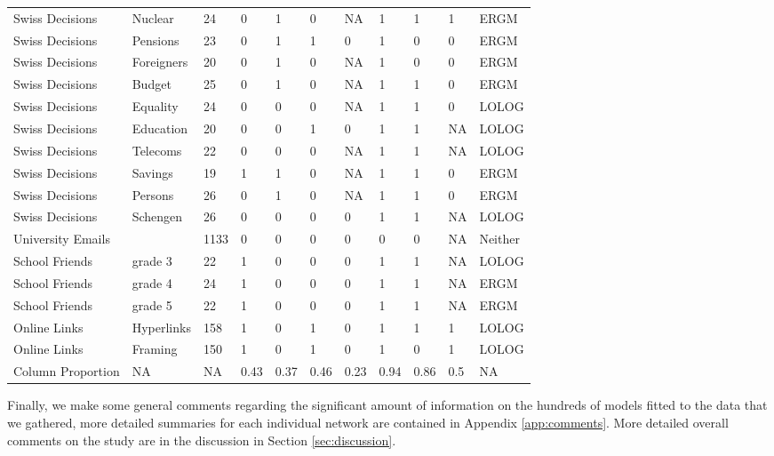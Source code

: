 \documentclass[
]{statsoc}
\begin{document}
\begin{table}
\begin{tabular}[t]{lllllllllll}
\addlinespace
\rowcolor{gray!6}  Swiss Decisions & Nuclear & 24 & 0 & 1 & 0 & NA & 1 & 1 & 1 & ERGM\\
Swiss Decisions & Pensions & 23 & 0 & 1 & 1 & 0 & 1 & 0 & 0 & ERGM\\
\rowcolor{gray!6}  Swiss Decisions & Foreigners & 20 & 0 & 1 & 0 & NA & 1 & 0 & 0 & ERGM\\
Swiss Decisions & Budget & 25 & 0 & 1 & 0 & NA & 1 & 1 & 0 & ERGM\\
\rowcolor{gray!6}  Swiss Decisions & Equality & 24 & 0 & 0 & 0 & NA & 1 & 1 & 0 & LOLOG\\
\addlinespace
Swiss Decisions & Education & 20 & 0 & 0 & 1 & 0 & 1 & 1 & NA & LOLOG\\
\rowcolor{gray!6}  Swiss Decisions & Telecoms & 22 & 0 & 0 & 0 & NA & 1 & 1 & NA & LOLOG\\
Swiss Decisions & Savings & 19 & 1 & 1 & 0 & NA & 1 & 1 & 0 & ERGM\\
\rowcolor{gray!6}  Swiss Decisions & Persons & 26 & 0 & 1 & 0 & NA & 1 & 1 & 0 & ERGM\\
Swiss Decisions & Schengen & 26 & 0 & 0 & 0 & 0 & 1 & 1 & NA & LOLOG\\
\addlinespace
\rowcolor{gray!6}  University Emails &  & 1133 & 0 & 0 & 0 & 0 & 0 & 0 & NA & Neither\\
School Friends & grade 3 & 22 & 1 & 0 & 0 & 0 & 1 & 1 & NA & LOLOG\\
\rowcolor{gray!6}  School Friends & grade 4 & 24 & 1 & 0 & 0 & 0 & 1 & 1 & NA & ERGM\\
School Friends & grade 5 & 22 & 1 & 0 & 0 & 0 & 1 & 1 & NA & ERGM\\
\rowcolor{gray!6}  Online Links & Hyperlinks & 158 & 1 & 0 & 1 & 0 & 1 & 1 & 1 & LOLOG\\
\addlinespace
Online Links & Framing & 150 & 1 & 0 & 1 & 0 & 1 & 0 & 1 & LOLOG\\
\hline
\hline
\rowcolor{gray!6}  Column Proportion & NA & NA & 0.43 & 0.37 & 0.46 & 0.23 & 0.94 & 0.86 & 0.5 & NA\\
\bottomrule
\end{tabular}
\end{table}

Finally, we make some general comments regarding the significant amount
of information on the hundreds of models fitted to the data that we
gathered, more detailed summaries for each individual network are
contained in Appendix \ref{app:comments}. More detailed overall comments
on the study are in the discussion in Section \ref{sec:discussion}.
\end{document}

